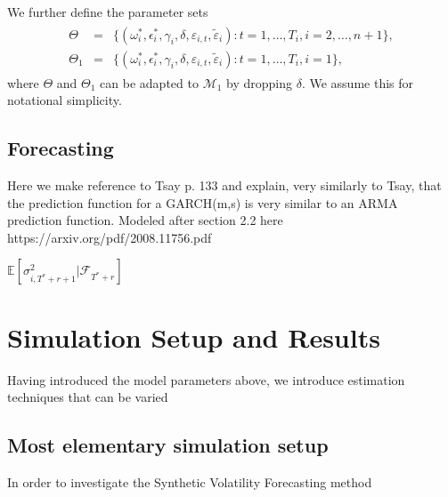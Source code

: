 \documentclass[11pt]{article}
\def\t#1{\tilde{#1}} %
\def\mc#1{\mathcal{#1}} %
\def\mc#1{\mathcal{#1}}
\theoremstyle{definition}
\begin{document}
We further define the parameter sets
\begin{align}
  \begin{array}{lll}
     \Theta &= &\{(\omega^{*}_i, \epsilon^{*}_i,\gamma_i, \delta,\varepsilon_{i,t},\t\varepsilon_{i})\colon t= 1, \ldots, T_i, i = 2, \ldots, n +1\},\\
    \Theta_1 &= &\{(\omega^{*}_i, \epsilon^{*}_i,\gamma_i, \delta,\varepsilon_{i,t},\t\varepsilon_{i})\colon t= 1, \ldots, T_i, i = 1\},\label{parameter}
  \end{array}
\end{align}
where $\Theta$ and $\Theta_1$ can be adapted to $\mc{M}_1$ by dropping $\delta$. We assume this for notational simplicity.

\subsection{Forecasting}

Here we make reference to Tsay p. 133 and explain, very similarly to Tsay, that the prediction function for a GARCH(m,s) is very similar to an ARMA prediction function.  Modeled after section 2.2 here https://arxiv.org/pdf/2008.11756.pdf

$\mathbb{E}[ \sigma^{2}_{i,T^{*}+r+1} |\mathcal{F}_{T^{*}+r}]$

\section{Simulation Setup and Results}

Having introduced the model parameters above, we introduce estimation techniques that can be varied

\subsection{Most elementary simulation setup}

In order to investigate the Synthetic Volatility Forecasting method
\end{document}
